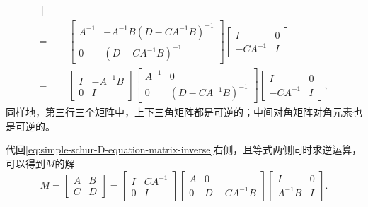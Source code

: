\begin{subappendices}
\begin{equation*}
\begin{split}
\begin{bmatrix}
    \end{bmatrix} \\
    =&\begin{bmatrix}
    A^{-1} & - A^{-1} B \left(D - C A^{-1} B\right)^{-1} \\
    0 & \left(D - C A^{-1} B\right)^{-1}
    \end{bmatrix}
    \begin{bmatrix}
      I & 0 \\
      -CA^{-1} & I
    \end{bmatrix} \\
    =& \begin{bmatrix}
    I & - A^{-1} B \\
    0 & I
    \end{bmatrix}
    \begin{bmatrix}
      A^{-1} & 0 \\
      0 & \left(D - C A^{-1} B\right)^{-1}
    \end{bmatrix}
    \begin{bmatrix}
      I & 0 \\
      -C A^{-1} & I
    \end{bmatrix},
  \end{split}
\end{equation*}
同样地，第三行三个矩阵中，上下三角矩阵都是可逆的；中间对角矩阵对角元素也是可逆的。

代回\eqref{eq:simple-schur-D-equation-matrix-inverse}右侧，且等式两侧同时求逆运算，可以得到$M$的解
\begin{equation}
  \label{eq:simple-schur-D-equation-matrix-M}
  M = \begin{bmatrix}
    A & B \\ C & D
  \end{bmatrix}= \begin{bmatrix}
    I & CA^{-1} \\
    0 & I
  \end{bmatrix}
  \begin{bmatrix}
    A  & 0 \\
    0 & D - CA^{-1} B
  \end{bmatrix}
  \begin{bmatrix}
  I & 0 \\
  A^{-1} B & I
  \end{bmatrix}.
\end{equation}


\end{subappendices}
